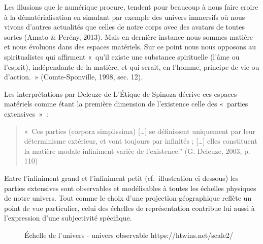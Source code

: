 \documentclass[
  a4paper,
  DIV=11,
  numbers=noendperiod]{scrreprt}
\begin{document}
Les illusions que le numérique procure, tendent pour beaucoup à nous
faire croire à la dématérialisation en simulant par exemple des univers
immersifs où nous vivons d'autres actualités que celles de notre corps
avec des avatars de toutes sortes (Amato \& Perény, 2013). Mais en
dernière instance nous sommes matière et nous évoluons dans des espaces
matériels. Sur ce point nous nous opposons au spiritualistes qui
affirment «~qu'il existe une substance spirituelle (l'âme ou l'esprit),
indépendante de la matière, et qui serait, en l'homme, principe de vie
ou d'action.~» (Comte-Sponville, 1998, sec. 12).

Les interprétations par Deleuze de L'Étique de Spinoza décrive ces
espaces matériels comme étant la première dimension de l'existence celle
des «~parties extensives~»~:

\begin{quote}
«~Ces parties (corpora simplissima) {[}\ldots{]} se définissent
uniquement par leur déterminisme extérieur, et vont toujours par
infinités ; {[}\ldots{]} elles constituent la matière modale infiniment
variée de l'existence.'' (G. Deleuze, 2003, p. 110)
\end{quote}

Entre l'infiniment grand et l'infiniment petit (cf.~illustration ci
dessous) les parties extensives sont observables et modélisables à
toutes les échelles physiques de notre univers. Tout comme le choix
d'une projection géographique reflète un point de vue particulier, celui
des échelles de représentation contribue lui aussi à l'expression d'une
subjectivité spécifique.

\begin{figure}


\caption{\label{fig-echelleUnivers}Échelle de l'univers - univers
observable https://htwins.net/scale2/}

\end{figure}%
\end{document}
